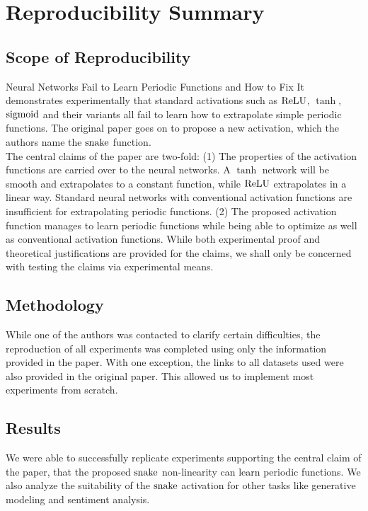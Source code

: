 \section*{\centering Reproducibility Summary}

\subsection*{Scope of Reproducibility}

Neural Networks Fail to Learn Periodic Functions and How to Fix It \cite{ziyin2020neural} demonstrates experimentally that standard activations such as \( \operatorname{ReLU} \), \( \tanh \), \( \operatorname{sigmoid} \) and their variants all fail to learn how to extrapolate simple periodic functions. The original paper goes on to propose a new activation, which the authors name the $\operatorname{snake}$ function. \\

The central claims of the paper are two-fold: (1) The properties of the activation functions are carried over to the neural networks. A \( \tanh \) network will be smooth and extrapolates to a constant function, while \( \operatorname{ReLU} \) extrapolates in a linear way. Standard neural networks with conventional activation functions are insufficient for extrapolating periodic functions. (2) The proposed activation function manages to learn periodic functions while being able to optimize as well as conventional activation functions. While both experimental proof and theoretical justifications are provided for the claims, we shall only be concerned with testing the claims via experimental means.

\subsection*{Methodology}

While one of the authors was contacted to clarify certain difficulties, the reproduction of all experiments was completed using only the information provided in the paper.
With one exception, the links to all datasets used were also provided in the original paper. This allowed us to implement most experiments from scratch.

\subsection*{Results}

We were able to successfully replicate experiments supporting the central claim of the paper, that the proposed \( \operatorname{snake} \) non-linearity can learn periodic functions. We also analyze the suitability of the \( \operatorname{snake} \) activation for other tasks like generative modeling and sentiment analysis.


